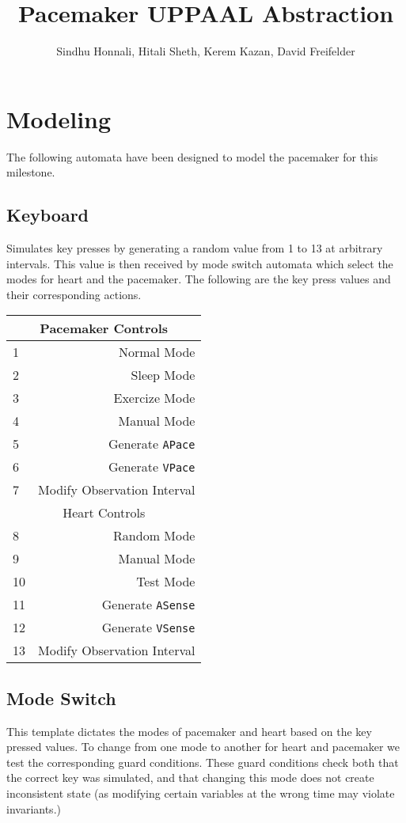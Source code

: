 \documentclass[a4paper]{article}
\title{Pacemaker UPPAAL Abstraction}
\author{Sindhu Honnali, Hitali Sheth, Kerem Kazan, David Freifelder}
\begin{document}
\maketitle

\section{Modeling}
The following automata have been designed to model the pacemaker for this milestone.
\subsection{Keyboard}
\begin{multicols}{2}
Simulates key presses by generating a random value from 1 to 13 at arbitrary intervals. This value is then received by mode switch automata which select the modes for heart and the pacemaker.
The following are the key press values and their corresponding actions.

\begin{tabular}{| l | r |}
  \hline
  \multicolumn{2}{|c|}{Pacemaker Controls} \\
  \hline
  1 & Normal Mode \\
  2 & Sleep Mode \\
  3 & Exercize Mode \\
  4 & Manual Mode \\
  5 & Generate {\tt APace} \\
  6 & Generate {\tt VPace} \\
  7 & Modify Observation Interval \\
  \hline
  \multicolumn{2}{|c|}{Heart Controls} \\
  \hline
  8 & Random Mode \\
  9 & Manual Mode  \\
  10 & Test Mode  \\
  11 & Generate {\tt ASense} \\
  12 & Generate {\tt VSense} \\
  13 & Modify Observation Interval \\
  \hline
\end{tabular}
\end{multicols}

\subsection{Mode Switch} This template dictates the modes of pacemaker and heart based on the key pressed values. To change from one mode to another for heart and pacemaker we test the corresponding guard conditions.  These guard conditions check both that the correct key was simulated, and that changing this mode does not create inconsistent state (as modifying certain variables at the wrong time may violate invariants.)
\end{document}
